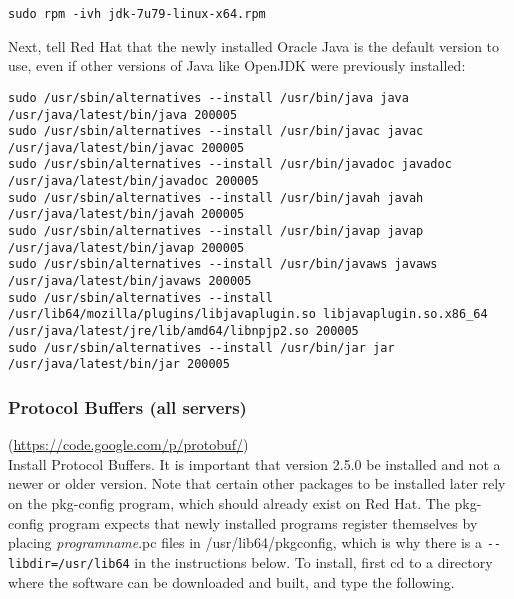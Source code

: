 \begin{verbatim}
sudo rpm -ivh jdk-7u79-linux-x64.rpm
\end{verbatim}

Next, tell Red Hat that the newly installed Oracle Java is the default
version to use, even if other versions of Java like OpenJDK were
previously installed:

\begin{verbatim}
sudo /usr/sbin/alternatives --install /usr/bin/java java /usr/java/latest/bin/java 200005
sudo /usr/sbin/alternatives --install /usr/bin/javac javac /usr/java/latest/bin/javac 200005
sudo /usr/sbin/alternatives --install /usr/bin/javadoc javadoc /usr/java/latest/bin/javadoc 200005
sudo /usr/sbin/alternatives --install /usr/bin/javah javah /usr/java/latest/bin/javah 200005
sudo /usr/sbin/alternatives --install /usr/bin/javap javap /usr/java/latest/bin/javap 200005
sudo /usr/sbin/alternatives --install /usr/bin/javaws javaws /usr/java/latest/bin/javaws 200005
sudo /usr/sbin/alternatives --install /usr/lib64/mozilla/plugins/libjavaplugin.so libjavaplugin.so.x86_64 /usr/java/latest/jre/lib/amd64/libnpjp2.so 200005
sudo /usr/sbin/alternatives --install /usr/bin/jar jar /usr/java/latest/bin/jar 200005
\end{verbatim}



\subsubsection{Protocol Buffers (all servers)} (\url{https://code.google.com/p/protobuf/})\\
Install Protocol Buffers.  It is important that version 2.5.0 be installed
and not a newer or older version.  Note that certain other packages
to be installed later rely on the pkg-config program, which should
already exist on Red Hat.  The pkg-config program expects that newly
installed programs register themselves by placing \emph{programname}.pc files in
/usr/lib64/pkgconfig, which is why there is a \verb|--libdir=/usr/lib64|
in the instructions below.  To install, first cd to a directory where
the software can be downloaded and built, and type the following.


